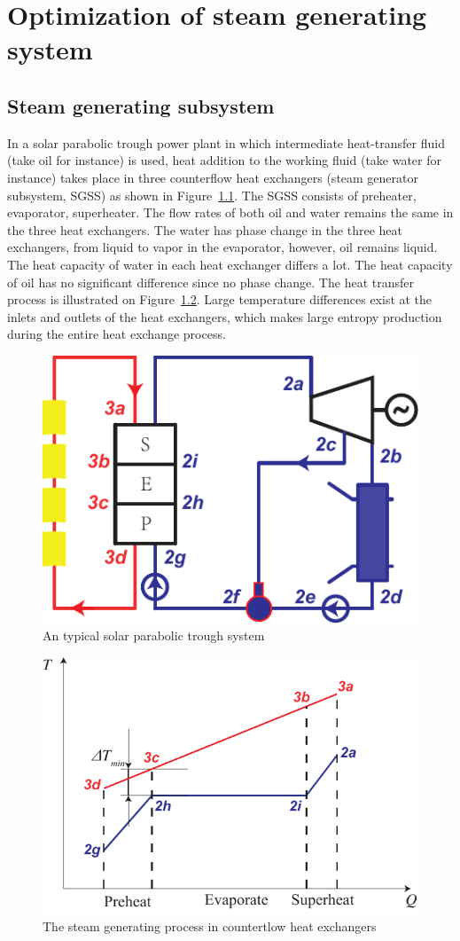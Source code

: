\chapter{Optimization of steam generating system}
\label{cha:osgs}
\section{Steam generating subsystem}

In a solar parabolic trough power plant in which intermediate heat-transfer fluid (take oil for instance) is used, heat addition to the working fluid (take water for instance) takes place in three counterflow heat exchangers (steam generator subsystem, SGSS) as shown in Figure~\ref{fig:PTC}. The SGSS consists of preheater, evaporator, superheater. The flow rates of both oil and water remains the same in the three heat exchangers. 
The water has phase change in the three heat exchangers, from liquid to vapor in the evaporator, however, oil remains liquid. The heat capacity of water in each heat exchanger differs a lot. The heat capacity of oil has no significant difference since no phase change. The heat transfer process is illustrated on Figure~\ref{fig:DeltaTmin}. Large temperature differences exist at the inlets and outlets of the heat exchangers, which makes large entropy production during the entire heat exchange process.


\noindent \begin{figure}[htbp]
\begin{center}
	\includegraphics[width = 0.5\columnwidth]{fig/PTC}
	\caption{An typical solar parabolic trough system}
	\label{fig:PTC}
\end{center}
\end{figure}

\noindent \begin{figure}[htbp]
\begin{center}
	\includegraphics[width = 0.5\columnwidth]{fig/DeltaTmin}
	\caption{The steam generating process in countertlow heat exchangers}
	\label{fig:DeltaTmin}
\end{center}
\end{figure}

